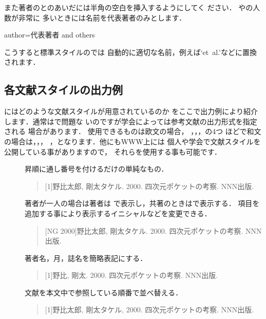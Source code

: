 また著者のとのあいだには半角の空白を挿入するようにしてく
ださい．
やの人数が非常に
多いときには名前を代表著者のみとします．

\begin{InText}
author={代表著者 and others}
\end{InText}

こうすると標準スタイルのでは
自動的に適切な名前，例えば`et~al.'などに置換されます．


\subsection{各文献スタイルの出力例}
%

{\BibTeX}にはどのような文献スタイルが用意されているのか
をここで出力例により紹介します．通常はで問題な
いのですが学会によっては参考文献の出力形式を指定される
場合があります．%
使用できるものは欧文の場合，
，，，の4つ
ほどで和文の場合は，，，
，となります．他にもWWW上には
個人や学会で文献スタイルを公開している事がありますので，
それらを使用する事も可能です． 
\begin{description}
\item[] 昇順に通し番号を付けるだけの単純なもの．
  \begin{quote}
  {[1]}野比太郎, 剛太タケル. 2000. 四次元ポケットの考察. NNN出版.
  \end{quote}
\item[] 著者が一人の場合は著者は
  で表示し，共著のときはで表示する．
   項目を追加する事により表示するイニシャルなどを変更できる．
  \begin{quote}
  {[NG 2000]}野比太郎, 剛太タケル. 2000. 四次元ポケットの考察. NNN出版. 
  \end{quote}
\item[] 著者名，月，誌名を簡略表記にする．
  \begin{quote}
  {[1]}野比, 剛太. 2000. 四次元ポケットの考察. NNN出版. 
  \end{quote}
\item[] 文献を本文中で参照している順番で並べ替える． 
  \begin{quote}
  {[1]}野比太郎, 剛太タケル, 2000. 四次元ポケットの考察. NNN出版.
  \end{quote}
\end{description}


